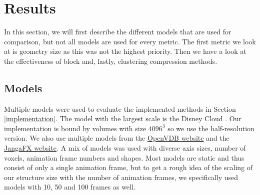 \section{Results} \label{results}
In this section, we will first describe the different models that are used for comparison, but not all models are used for every metric. The first metric we look at is geometry size as this was not the highest priority. Then we have a look at the effectiveness of block and, lastly, clustering compression methods.


\subsection{Models} \label{results:models}
Multiple models were used to evaluate the implemented methods in Section \ref{implementation}. The model with the largest scale is the Disney Cloud \cite{DisneyCloud}. Our implementation is bound by volumes with size $4096^3$ so we use the half-resolution version. We also use multiple models from the \href{https://www.openvdb.org/download/}{OpenVDB website} and the \href{https://jangafx.com/software/embergen/download/free-vdb-animations/}{JangaFX website}. A mix of models was used with diverse axis sizes, number of voxels, animation frame numbers and shapes. Most models are static and thus consist of only a single animation frame, but to get a rough idea of the scaling of our structure size with the number of animation frames, we specifically used models with 10, 50 and 100 frames as well.


